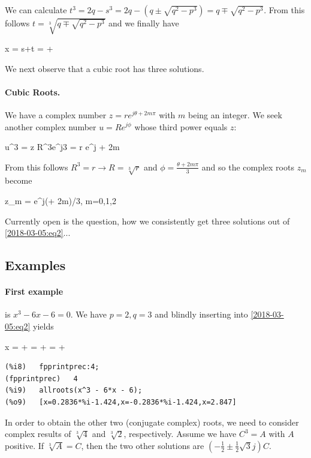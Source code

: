 We can calculate $t^3 = 2q - s^3 = 2q - (q \pm \sqrt{q^2 - p^3}) = q \mp \sqrt{q^2 - p^3}$. From this follows $t = \sqrt[3]{q \mp \sqrt{q^2 - p^3}}$ and we finally have

\be
\label{2018-03-05:eq2}
x = s+t =  + 
\ee

We next observe that a cubic root has three solutions.

\paragraph{Cubic Roots.} We have a complex number $z = r e^{j \theta + 2m\pi}$ with $m$ being an integer. We seek another complex number $u = Re^{j\phi}$ whose third power equals $z$:

\bee
u^3 = z \rightarrow R^3e^{j3\phi} = r e^{j \theta + 2m\pi}
\eee

From this follows $R^3 = r \rightarrow R = \sqrt[3]{r}$ and $\phi = \frac{\theta +2m\pi}{3}$ and so the complex roots $z_m$ become

\bee
z_m =  e^{j(\theta + 2m\pi)/3}, \quad m=0,1,2
\eee

Currently open is the question, how we consistently get three solutions out of \eqref{2018-03-05:eq2}...


\subsection{Examples}

\paragraph{First example} is $x^3 - 6x - 6 = 0$. We have $p=2, q=3$ and blindly inserting into \eqref{2018-03-05:eq2} yields

\bee
x =  +  =  +  =  +  
\eee

\begin{verbatim}
(%i8)	fpprintprec:4;
(fpprintprec)	4
(%i9)	allroots(x^3 - 6*x - 6);
(%o9)	[x=0.2836*%i-1.424,x=-0.2836*%i-1.424,x=2.847]
\end{verbatim}

In order to obtain the other two (conjugate complex) roots,  we need to consider complex results of $\sqrt[3]{4}$ and $\sqrt[3]{2}$, respectively. Assume we have $C^3 = A$ with $A$ positive. If $\sqrt[3]{A} = C$, then the two other solutions are $\left(-\frac{1}{2} \pm \frac{1}{2}\sqrt{3}j\right)C$.

